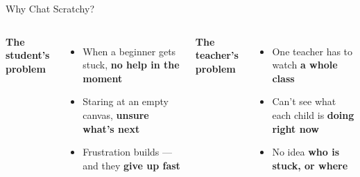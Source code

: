 \documentclass[aspectratio=169,11pt]{beamer}
\newcommand{\headingfont}{\bfseries}
\begin{document}
\begin{frame}{Why Chat Scratchy?}
  \begin{columns}[T]
      \small
      {\color{scPurple}\headingfont\normalsize The student's problem}\\[0.4em]
      \begin{itemize}\setlength\itemsep{0.25em}
        \item When a beginner gets stuck, \textbf{no help in the moment}
        \item Staring at an empty canvas, \textbf{unsure what's next}
        \item Frustration builds --- and they \textbf{give up fast}
      \end{itemize}
      \vspace{0.6em}
      {\color{scPink}\headingfont\normalsize The teacher's problem}\\[0.4em]
      \begin{itemize}\setlength\itemsep{0.25em}
        \item One teacher has to watch \textbf{a whole class}
        \item Can't see what each child is \textbf{doing right now}
        \item No idea \textbf{who is stuck, or where}
      \end{itemize}
      \vspace{1.2em}
  \end{columns}
\end{frame}
\end{document}
